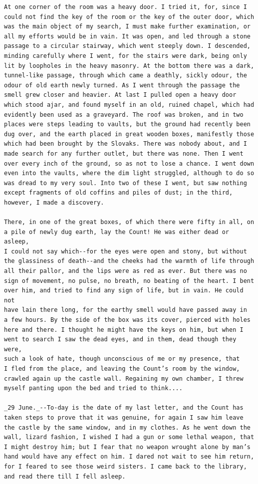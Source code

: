 \documentclass{article}
\begin{document}
\begin{verbatim}
At one corner of the room was a heavy door. I tried it, for, since I
could not find the key of the room or the key of the outer door, which
was the main object of my search, I must make further examination, or
all my efforts would be in vain. It was open, and led through a stone
passage to a circular stairway, which went steeply down. I descended,
minding carefully where I went, for the stairs were dark, being only
lit by loopholes in the heavy masonry. At the bottom there was a dark,
tunnel-like passage, through which came a deathly, sickly odour, the
odour of old earth newly turned. As I went through the passage the
smell grew closer and heavier. At last I pulled open a heavy door
which stood ajar, and found myself in an old, ruined chapel, which had
evidently been used as a graveyard. The roof was broken, and in two
places were steps leading to vaults, but the ground had recently been
dug over, and the earth placed in great wooden boxes, manifestly those
which had been brought by the Slovaks. There was nobody about, and I
made search for any further outlet, but there was none. Then I went
over every inch of the ground, so as not to lose a chance. I went down
even into the vaults, where the dim light struggled, although to do so
was dread to my very soul. Into two of these I went, but saw nothing
except fragments of old coffins and piles of dust; in the third,
however, I made a discovery.

There, in one of the great boxes, of which there were fifty in all, on
a pile of newly dug earth, lay the Count! He was either dead or asleep,
I could not say which--for the eyes were open and stony, but without
the glassiness of death--and the cheeks had the warmth of life through
all their pallor, and the lips were as red as ever. But there was no
sign of movement, no pulse, no breath, no beating of the heart. I bent
over him, and tried to find any sign of life, but in vain. He could not
have lain there long, for the earthy smell would have passed away in
a few hours. By the side of the box was its cover, pierced with holes
here and there. I thought he might have the keys on him, but when I
went to search I saw the dead eyes, and in them, dead though they were,
such a look of hate, though unconscious of me or my presence, that
I fled from the place, and leaving the Count’s room by the window,
crawled again up the castle wall. Regaining my own chamber, I threw
myself panting upon the bed and tried to think....

_29 June._--To-day is the date of my last letter, and the Count has
taken steps to prove that it was genuine, for again I saw him leave
the castle by the same window, and in my clothes. As he went down the
wall, lizard fashion, I wished I had a gun or some lethal weapon, that
I might destroy him; but I fear that no weapon wrought alone by man’s
hand would have any effect on him. I dared not wait to see him return,
for I feared to see those weird sisters. I came back to the library,
and read there till I fell asleep.


\end{verbatim}
\end{document}
